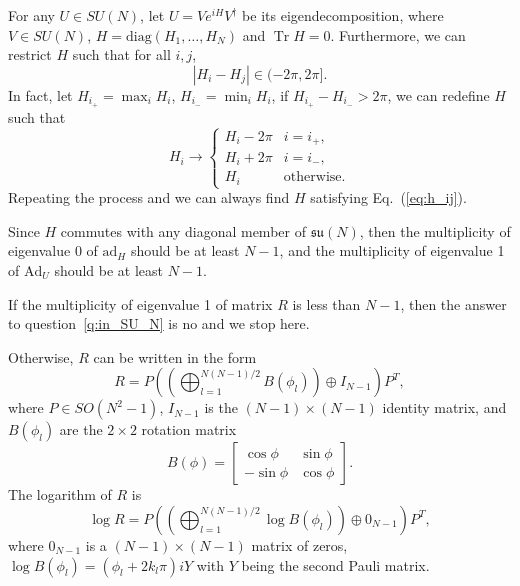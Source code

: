 \documentclass{article}
\DeclareMathOperator{\Tr}{Tr}
\begin{document}
For any $U\in SU(N)$, let $U = Ve^{iH}V^\dagger$ be its eigendecomposition,
where $V\in SU(N)$, $H = \text{diag}(H_1,\ldots,H_N)$ and $\Tr H = 0$.
Furthermore, we can restrict $H$ such that for all $i, j$,
\begin{equation}
  \label{eq:h_ij}
  |H_i-H_j| \in (-2\pi, 2\pi].
\end{equation}
In fact, let $H_{i_+} = \max_i H_i$, $H_{i_-} = \min_i H_i$, if
$H_{i_+}-H_{i_-} > 2\pi$, we can redefine $H$ such that
\begin{equation}
  H_i\rightarrow\begin{cases}
  H_i - 2\pi & i = i_+, \\
  H_i + 2\pi & i = i_-, \\
  H_i & \text{otherwise}.
  \end{cases}
\end{equation}
Repeating the process and we can always find $H$ satisfying
Eq.~(\ref{eq:h_ij}).

Since $H$ commutes with any diagonal member of $\mathfrak{su}(N)$, then
the multiplicity of eigenvalue 0 of $\text{ad}_H$ should be at least $N-1$,
and the multiplicity of eigenvalue 1 of $\text{Ad}_U$ should be at least
$N-1$.

If the multiplicity of eigenvalue 1 of matrix $R$ is less than $N-1$, then
the answer to question~\ref{q:in_SU_N} is no and we stop here.

Otherwise, $R$ can be written in the form
\begin{equation}
  R = P\left(\left(\bigoplus_{l=1}^{N(N-1)/2}B(\phi_l)\right)
  \oplus I_{N-1}\right)P^T,
\end{equation}
where $P\in SO(N^2-1)$, $I_{N-1}$ is the $(N-1)\times(N-1)$ identity matrix,
and $B(\phi_l)$ are the $2\times2$ rotation matrix
\begin{equation}
  B(\phi) = \begin{bmatrix}\cos\phi&\sin\phi\\-\sin\phi&\cos\phi\end{bmatrix}.
\end{equation}
The logarithm of $R$ is
\begin{equation}
  \log R = P\left(\left(\bigoplus_{l=1}^{N(N-1)/2}\log B(\phi_l)\right)
  \oplus 0_{N-1}\right)P^T,
\end{equation}
where $0_{N-1}$ is a $(N-1)\times(N-1)$ matrix of zeros,
$\log B(\phi_l) = (\phi_l+2k_l\pi)iY$ with $Y$ being the second Pauli matrix.
\end{document}

